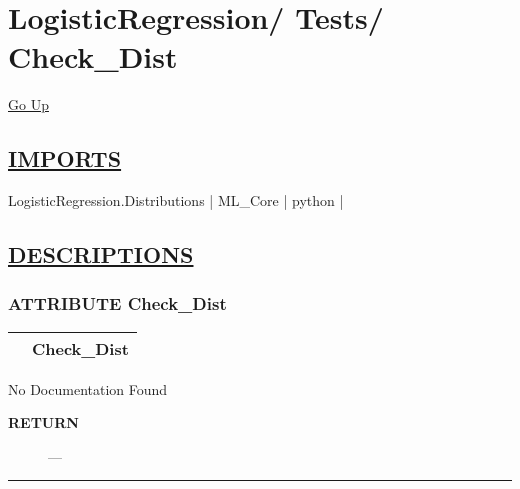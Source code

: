 \chapter*{\color{headfile}
{\large LogisticRegression\slash\hspace{0pt}}
{\large Tests\slash\hspace{0pt}}
 \\
Check_Dist
}
\hypertarget{ecldoc:toc:LogisticRegression.Tests.Check_Dist}{}
\hyperlink{ecldoc:toc:root/LogisticRegression/Tests}{Go Up}

\section*{\underline{\textsf{IMPORTS}}}
\begin{doublespace}
{\large
LogisticRegression.Distributions |
ML\_Core |
python |
}
\end{doublespace}

\section*{\underline{\textsf{DESCRIPTIONS}}}
\subsection*{\textsf{\colorbox{headtoc}{\color{white} ATTRIBUTE}
Check\_Dist}}

\hypertarget{ecldoc:logisticregression.tests.check_dist}{}

{\renewcommand{\arraystretch}{1.5}
\begin{tabularx}{\textwidth}{|>{\raggedright\arraybackslash}l|X|}
\hline
\hspace{0pt}\mytexttt{\color{red} } & \textbf{Check\_Dist} \\
\hline
\end{tabularx}
}

\par





No Documentation Found








\par
\begin{description}
\item [\colorbox{tagtype}{\color{white} \textbf{\textsf{RETURN}}}] \textbf{} --- 
\end{description}




\rule{\linewidth}{0.5pt}
